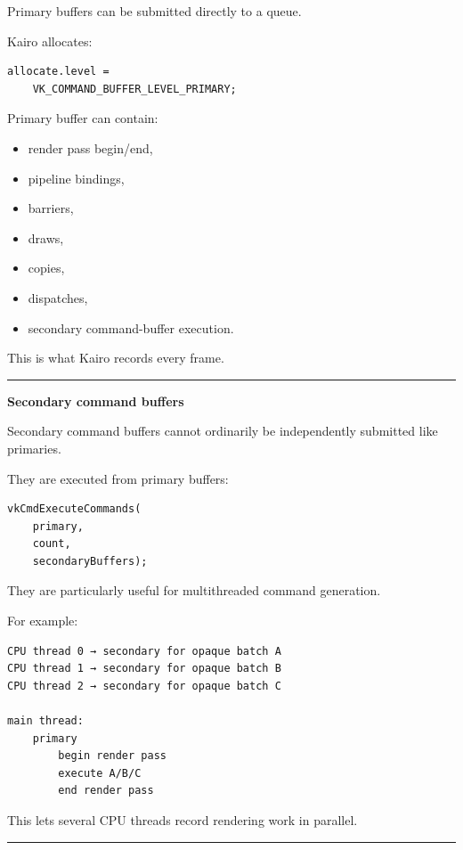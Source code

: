 Primary buffers can be submitted directly to a queue.

Kairo allocates:

\begin{verbatim}
allocate.level =
    VK_COMMAND_BUFFER_LEVEL_PRIMARY;
\end{verbatim}

Primary buffer can contain:

\begin{itemize}
\tightlist
\item
  render pass begin/end,
\item
  pipeline bindings,
\item
  barriers,
\item
  draws,
\item
  copies,
\item
  dispatches,
\item
  secondary command-buffer execution.
\end{itemize}

This is what Kairo records every frame.

\begin{center}\rule{0.5\linewidth}{0.5pt}\end{center}

\textbf{Secondary command buffers}

Secondary command buffers cannot ordinarily be independently submitted like primaries.

They are executed from primary buffers:

\begin{verbatim}
vkCmdExecuteCommands(
    primary,
    count,
    secondaryBuffers);
\end{verbatim}

They are particularly useful for multithreaded command generation.

For example:

\begin{verbatim}
CPU thread 0 → secondary for opaque batch A
CPU thread 1 → secondary for opaque batch B
CPU thread 2 → secondary for opaque batch C

main thread:
    primary
        begin render pass
        execute A/B/C
        end render pass
\end{verbatim}

This lets several CPU threads record rendering work in parallel.

\begin{center}\rule{0.5\linewidth}{0.5pt}\end{center}

